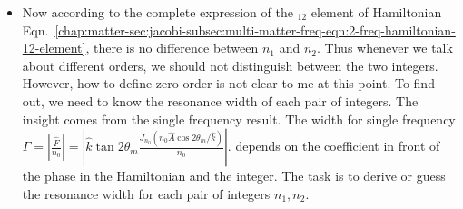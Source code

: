\begin{itemize}
\item Now according to the complete expression of the ${}_{12}$ element of Hamiltonian Eqn.~\ref{chap:matter-sec:jacobi-subsec:multi-matter-freq-eqn:2-freq-hamiltonian-12-element}, there is no difference between $n_1$ and $n_2$. Thus whenever we talk about different orders, we should not distinguish between the two integers. However, how to define zero order is not clear to me at this point. To find out, we need to know the resonance width of each pair of integers. The insight comes from the single frequency result. The width for single frequency $\Gamma = \left\lvert \frac{\hat F}{n_0} \right\rvert = \left\lvert \hat k \tan 2\theta_m \frac{ J_{n_0}( n_0 \hat A \cos 2\theta_m/\hat k )}{n_0} \right\rvert .
$ depends on the coefficient in front of the phase in the Hamiltonian and the integer. The task is to derive or guess the resonance width for each pair of integers $n_1, n_2$.

\end{itemize}









